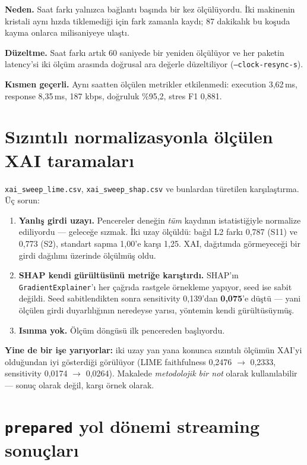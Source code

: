 \documentclass[11pt,a4paper]{report}
\newcommand{\ms}{\,ms}
\newcommand{\kod}[1]{\texttt{\small #1}}
\newcommand{\dosya}[1]{\texttt{\footnotesize #1}}
\begin{document}
\textbf{Neden.} Saat farkı yalnızca bağlantı başında bir kez ölçülüyordu. İki
makinenin kristali aynı hızda tiklemediği için fark zamanla kaydı; 87 dakikalık
bu koşuda kayma onlarca milisaniyeye ulaştı.

\textbf{Düzeltme.} Saat farkı artık 60 saniyede bir yeniden ölçülüyor ve her
paketin latency'si iki ölçüm arasında doğrusal ara değerle düzeltiliyor
(\kod{--clock-resync-s}).

\textbf{Kısmen geçerli.} Aynı saatten ölçülen metrikler etkilenmedi: execution
3{,}62\ms, response 8{,}35\ms, 187 kbps, doğruluk \%95{,}2, stres F1 0{,}881.

\section{Sızıntılı normalizasyonla ölçülen XAI taramaları}

\dosya{xai\_sweep\_lime.csv}, \dosya{xai\_sweep\_shap.csv} ve bunlardan
türetilen karşılaştırma. Üç sorun:

\begin{enumerate}[leftmargin=1.5em]
\item \textbf{Yanlış girdi uzayı.} Pencereler deneğin \emph{tüm} kaydının
istatistiğiyle normalize ediliyordu --- geleceğe sızmak. İki uzay ölçüldü:
bağıl L2 farkı 0{,}787 (S11) ve 0{,}773 (S2), standart sapma 1{,}00'e karşı
1{,}25. XAI, dağıtımda görmeyeceği bir girdi dağılımı üzerinde ölçülmüş oldu.

\item \textbf{SHAP kendi gürültüsünü metriğe karıştırdı.} SHAP'ın
\kod{GradientExplainer}'ı her çağrıda rastgele örnekleme yapıyor, seed ise
sabit değildi. Seed sabitlendikten sonra sensitivity 0{,}139'dan
\textbf{0{,}075}'e düştü --- yani ölçülen girdi duyarlılığının neredeyse yarısı, yöntemin
kendi gürültüsüymüş.

\item \textbf{Isınma yok.} Ölçüm döngüsü ilk pencereden başlıyordu.
\end{enumerate}

\textbf{Yine de bir işe yarıyorlar:} iki uzay yan yana konunca sızıntılı ölçümün
XAI'yi olduğundan iyi gösterdiği görülüyor (LIME faithfulness 0{,}2476
$\rightarrow$ 0{,}2333, sensitivity 0{,}0174 $\rightarrow$ 0{,}0264). Makalede
\emph{metodolojik bir not} olarak kullanılabilir --- sonuç olarak değil, karşı
örnek olarak.

\section{\kod{prepared} yol dönemi streaming sonuçları}
\end{document}
